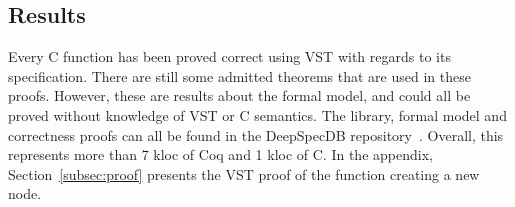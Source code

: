 \subsection{Results}
Every C function has been proved correct using VST with regards to its specification.
There are still some admitted theorems that are used in these proofs.
However, these are results about the formal model, and could all be proved without knowledge of VST or C semantics. The library, formal model and correctness proofs can all be found in the DeepSpecDB repository~\cite{deepdb}. Overall, this represents more than 7 kloc of Coq and 1 kloc of C.
In the appendix, Section~\ref{subsec:proof} presents the VST proof of the function creating a new node.
